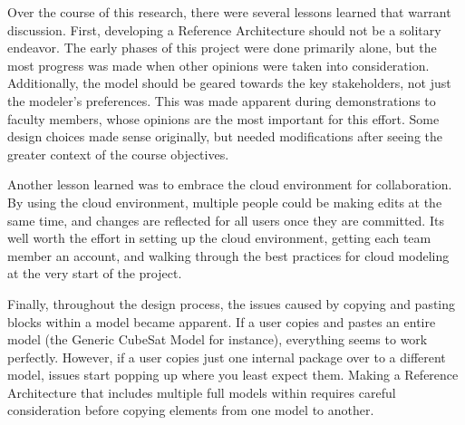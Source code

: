 
Over the course of this research, there were several lessons learned that warrant discussion. First, developing a Reference Architecture should not be a solitary endeavor. The early phases of this project were done primarily alone, but the most progress was made when other opinions were taken into consideration. Additionally, the model should be geared towards the key stakeholders, not just the modeler's preferences. This was made apparent during demonstrations to faculty members, whose opinions are the most important for this effort. Some design choices made sense originally, but needed modifications after seeing the greater context of the course objectives. 

Another lesson learned was to embrace the cloud environment for collaboration. By using the cloud environment, multiple people could be making edits at the same time, and changes are reflected for all users once they are committed. Its well worth the effort in setting up the cloud environment, getting each team member an account, and walking through the best practices for cloud modeling at the very start of the project. 

Finally, throughout the design process, the issues caused by copying and pasting blocks within a model became apparent. If a user copies and pastes an entire model (the Generic CubeSat Model for instance), everything seems to work perfectly. However, if a user copies just one internal package over to a different model, issues start popping up where you least expect them. Making a Reference Architecture that includes multiple full models within requires careful consideration before copying elements from one model to another. 
